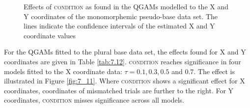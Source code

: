 \begin{figure}
    \centering
    
    \caption{Effects of \textsc{condition} as found in the QGAMs modelled to the X and Y coordinates of the monomorphemic pseudo-base data set. The lines indicate the confidence intervals of the estimated X and Y coordinate values}
    \label{fig:7_10}
\end{figure}

For the QGAMs fitted to the plural base data set, the effects found for X and Y coordinates are given in Table \ref{tab:7.12}. \textsc{condition} reaches significance in four models fitted to the X coordinate data: $\tau=0.1,0.3,0.5$ and $0.7$. The effect is illustrated in Figure \ref{fig:7_11}. Where \textsc{condition} shows a significant effect for X coordinates, coordinates of mismatched trials are further to the right. For Y coordinates, \textsc{condition} misses significance across all models.

